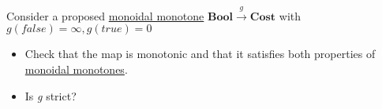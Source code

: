 Consider a proposed \hyperref[D2.41]{monoidal monotone} $\mathbf{Bool}\xrightarrow{g}\mathbf{Cost}$ with $g(false)=\infty, g(true)=0$
    \begin{itemize}
      \item Check that the map is monotonic and that it satisfies both properties of \hyperref[D2.41]{monoidal monotones}.
      \item Is \emph{g} strict?\end{itemize}